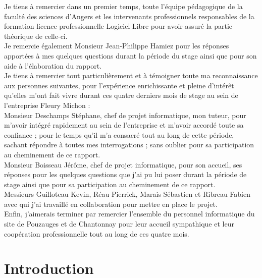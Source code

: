 \documentclass[a4paper,12pt]{extarticle}
\begin{document}
	Je tiens à remercier dans un premier temps, toute l’équipe pédagogique de la faculté des sciences d’Angers et les intervenants professionnels responsables de la formation licence professionnelle Logiciel Libre pour avoir assuré la partie théorique de celle-ci.\\
Je remercie également Monsieur Jean-Philippe Hamiez pour les réponses apportées à mes quelques questions durant la période du stage ainsi que pour son aide à l'élaboration du rapport.\\
Je tiens à remercier tout particulièrement et à témoigner toute ma reconnaissance aux personnes suivantes, pour l’expérience enrichissante et pleine d’intérêt qu’elles m’ont fait vivre durant ces quatre derniers mois de stage au sein de l’entreprise Fleury Michon : \\
Monsieur Deschamps Stéphane, chef de projet informatique, mon tuteur, pour m’avoir intégré rapidement au sein de l’entreprise et m’avoir accordé toute sa confiance ; pour le temps qu’il m’a consacré tout au long de cette période, sachant répondre à toutes mes interrogations ; sans oublier pour sa participation au cheminement de ce rapport.\\
Monsieur Boisseau Jérôme, chef de projet informatique, pour son accueil, ses réponses pour les quelques questions que j’ai pu lui poser durant la période de stage ainsi que pour sa participation au cheminement de ce rapport.\\
Messieurs Guilloteau Kevin, Réau Pierrick, Marais Sébastien et Ribreau Fabien avec qui j’ai travaillé en collaboration pour mettre en place le projet.\\
Enfin, j’aimerais terminer par remercier l’ensemble du personnel informatique du site de Pouzauges et de Chantonnay pour leur accueil sympathique et leur coopération professionnelle tout au long de ces quatre mois.\\

	\clearpage
	
	\section{Introduction}
		\paragraph{}
\end{document}
